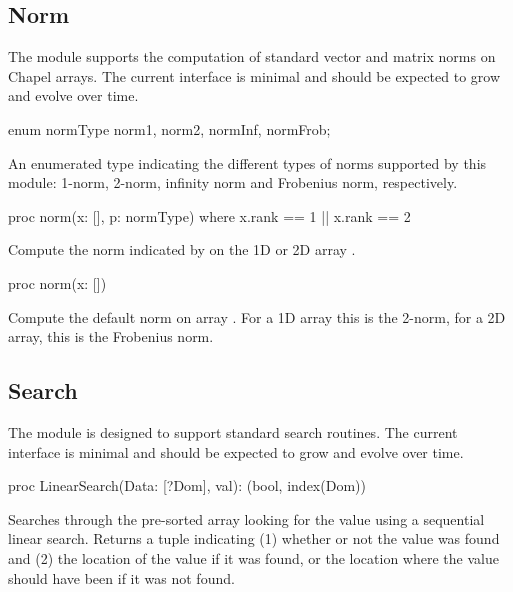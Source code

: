 \subsection{Norm}
\label{Norm}

The module  supports the computation of standard vector and
matrix norms on Chapel arrays.  The current interface is minimal and
should be expected to grow and evolve over time.

\begin{protohead}
enum normType {norm1, norm2, normInf, normFrob};
\end{protohead}
\begin{protobody}
An enumerated type indicating the different types of norms supported
by this module: 1-norm, 2-norm, infinity norm and Frobenius norm,
respectively.
\end{protobody}

\begin{protohead}
proc norm(x: [], p: normType) where x.rank == 1 || x.rank == 2
\end{protohead}
\begin{protobody}
Compute the norm indicated by  on the 1D or 2D array .
\end{protobody}

\begin{protohead}
proc norm(x: [])
\end{protohead}
\begin{protobody}
Compute the default norm on array .  For a 1D array this is
the 2-norm, for a 2D array, this is the Frobenius norm.
\end{protobody}


\subsection{Search}
\label{Search}

The  module is designed to support standard search
routines.  The current interface is minimal and should be expected to
grow and evolve over time.

\begin{protohead}
proc LinearSearch(Data: [?Dom], val): (bool, index(Dom))
\end{protohead}
\begin{protobody}
Searches through the pre-sorted array  looking for the
value  using a sequential linear search.  Returns a tuple
indicating (1) whether or not the value was found and (2) the location
of the value if it was found, or the location where the value should
have been if it was not found.
\end{protobody}

